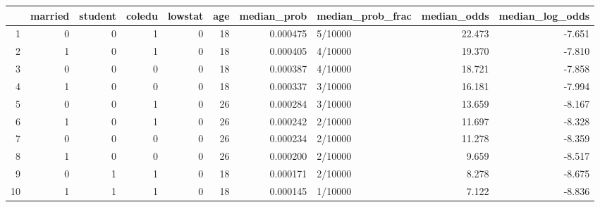 \begin{table}[ht]
\centering
\begin{tabular}{rrrrrrrlrr}
  \hline
 & married & student & coledu & lowstat & age & median\_prob & median\_prob\_frac & median\_odds & median\_log\_odds \\ 
  \hline
1 &       0 &       0 &       1 &       0 &      18 & 0.000475 & 5/10000 & 22.473 & -7.651 \\ 
  2 &       1 &       0 &       1 &       0 &      18 & 0.000405 & 4/10000 & 19.370 & -7.810 \\ 
  3 &       0 &       0 &       0 &       0 &      18 & 0.000387 & 4/10000 & 18.721 & -7.858 \\ 
  4 &       1 &       0 &       0 &       0 &      18 & 0.000337 & 3/10000 & 16.181 & -7.994 \\ 
  5 &       0 &       0 &       1 &       0 &      26 & 0.000284 & 3/10000 & 13.659 & -8.167 \\ 
  6 &       1 &       0 &       1 &       0 &      26 & 0.000242 & 2/10000 & 11.697 & -8.328 \\ 
  7 &       0 &       0 &       0 &       0 &      26 & 0.000234 & 2/10000 & 11.278 & -8.359 \\ 
  8 &       1 &       0 &       0 &       0 &      26 & 0.000200 & 2/10000 & 9.659 & -8.517 \\ 
  9 &       0 &       1 &       1 &       0 &      18 & 0.000171 & 2/10000 & 8.278 & -8.675 \\ 
  10 &       1 &       1 &       1 &       0 &      18 & 0.000145 & 1/10000 & 7.122 & -8.836 \\ 
   \hline
\end{tabular}
\end{table}

